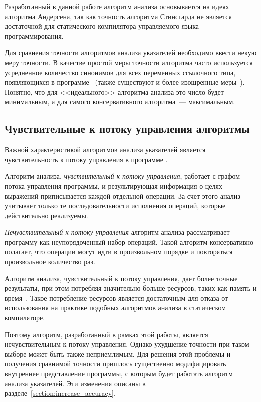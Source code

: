 \documentclass[14pt,titlepage,draft]{extarticle}
\begin{document}
    Разработанный в данной работе алгоритм анализа основывается на идеях
    алгоритма Андерсена, так как точность алгоритма Стинсгарда не является
    достаточной для статического компилятора управляемого языка
    программирования.

    Для сравнения точности алгоритмов анализа указателей необходимо ввести
    некую меру точности. В качестве простой меры точности алгоритма часто
    используется усредненное количество синонимов для всех переменных
    ссылочного типа, появляющихся в
    программе~\cite[раздел~3.2]{hind_pointer_analysis_not_solved_yet}
    (также существуют и более изощренные
    меры~\cite{hind_pointer_analysis_not_solved_yet,diwan_tbaa}).
    Понятно, что для <<идеального>> алгоритма анализа это число будет
    минимальным, а для самого консервативного алгоритма~--- максимальным.

  \subsection{Чувствительные к потоку управления алгоритмы}
    \label{section:choosing_flow_insensitive}

    Важной характеристикой алгоритмов анализа указателей является
    чувствительность к потоку управления в программе
    .

    Алгоритм анализа, \emph{чувствительный к потоку управления}, работает с
    графом потока управления программы, и результирующая информация о целях
    выражений приписывается каждой отдельной операции. За счет этого анализ
    учитывает только те последовательности исполнения операций, которые
    действительно реализуемы.

    \emph{Нечувствительный к потоку управления} алгоритм анализа рассматривает
    программу как неупорядоченный набор операций. Такой алгоритм
    консервативно полагает, что операции могут идти в произвольном порядке и
    повторяться произвольное количество раз.

    Алгоритм анализа, чувствительный к потоку управления, дает более точные
    результаты, при этом потребляя значительно больше ресурсов, таких как
    память и время~\cite[раздел.~4.4]{hind_pointer_analysis_not_solved_yet}.
    Такое потребление ресурсов является достаточным для отказа от
    использования на практике подобных алгоритмов анализа в статическом
    компиляторе.

    Поэтому алгоритм, разработанный в рамках этой работы, является
    нечувствительным к потоку управления. Однако ухудшение точности при таком
    выборе может быть также неприемлимым.
    Для решения этой проблемы и получения сравнимой точности пришлось
    существенно модифицировать внутреннее представление программы, с которым
    будет работать алгоритм анализа указателей. Эти изменения описаны в
    разделе~\ref{section:increase_accuracy}.
\end{document}
